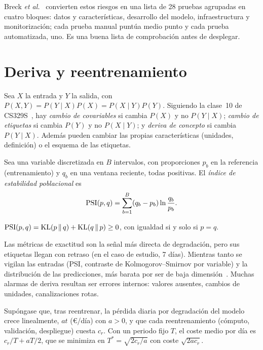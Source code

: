 Breck \emph{et al.}~\cite{breck} convierten estos riesgos en una lista de 28 pruebas agrupadas en cuatro bloques: datos y características, desarrollo del modelo, infraestructura y monitorización; cada prueba manual puntúa medio punto y cada prueba automatizada, uno. Es una buena lista de comprobación antes de desplegar.

\section{Deriva y reentrenamiento}

\begin{definicion}\label{def:deriva}
Sea $X$ la entrada y $Y$ la salida, con $P(X,Y)=P(Y\mid X)P(X)=P(X\mid Y)P(Y)$. Siguiendo la clase~10 de CS329S~\cite{cs329s}, hay \emph{cambio de covariables} si cambia $P(X)$ y no $P(Y\mid X)$; \emph{cambio de etiquetas} si cambia $P(Y)$ y no $P(X\mid Y)$; y \emph{deriva de concepto} si cambia $P(Y\mid X)$. Además pueden cambiar las propias características (unidades, definición) o el esquema de las etiquetas.
\end{definicion}

\begin{definicion}\label{def:psi}
Sea una variable discretizada en $B$ intervalos, con proporciones $p_b$ en la referencia (entrenamiento) y $q_b$ en una ventana reciente, todas positivas. El \emph{índice de estabilidad poblacional} es
\[
\operatorname{PSI}(p,q)=\sum_{b=1}^{B}(q_b-p_b)\ln\frac{q_b}{p_b}.
\]
\end{definicion}

\begin{proposicion}\label{prop:psi}
$\operatorname{PSI}(p,q)=\operatorname{KL}(p\,\|\,q)+\operatorname{KL}(q\,\|\,p)\ge 0$, con igualdad si y solo si $p=q$.
\end{proposicion}

\addtocounter{definicion}{1}%

Las métricas de exactitud son la señal más directa de degradación, pero sus etiquetas llegan con retraso (en el caso de estudio, 7 días). Mientras tanto se vigilan las entradas (PSI, contraste de Kolmogorov--Smirnov por variable) y la distribución de las predicciones, más barata por ser de baja dimensión~\cite{cs329s}. Muchas alarmas de deriva resultan ser errores internos: valores ausentes, cambios de unidades, canalizaciones rotas.

\begin{proposicion}\label{prop:reentreno}
Supóngase que, tras reentrenar, la pérdida diaria por degradación del modelo crece linealmente, $at$ (€/día) con $a>0$, y que cada reentrenamiento (cómputo, validación, despliegue) cuesta $c_r$. Con un periodo fijo $T$, el coste medio por día es $c_r/T+aT/2$, que se minimiza en $T^{*}=\sqrt{2c_r/a}$ con coste $\sqrt{2ac_r}$.
\end{proposicion}

